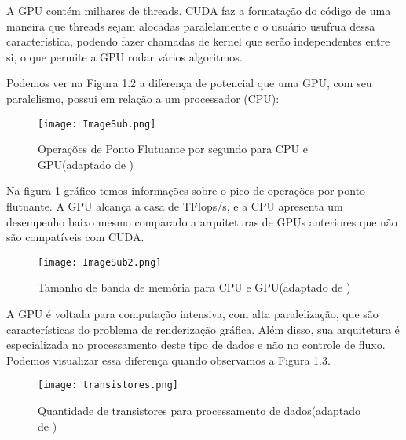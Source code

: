 A GPU contém milhares de threads. CUDA faz a formatação do código de uma maneira que threads sejam alocadas paralelamente e o usuário usufrua dessa característica, podendo fazer chamadas de kernel que serão independentes entre si, o que permite a GPU rodar vários algoritmos.

Podemos ver na Figura 1.2 a diferença de potencial que uma GPU, com seu paralelismo, possui em relação a um processador (CPU):

\begin{figure}[!htb]
	\begin{center}
	\centering
			\texttt{[image: ImageSub.png]}
	\label{fig: graficosCuda1}
	\caption{Operações de Ponto Flutuante por segundo para CPU e GPU(adaptado de \cite{cuda})}
	\end{center}
\end{figure}

Na figura \ref{fig: graficosCuda1} gráfico temos informações sobre o pico de operações por ponto flutuante. A GPU alcança a casa de TFlops/s, e a CPU apresenta um desempenho baixo mesmo comparado a arquiteturas de GPUs anteriores que não são compatíveis com CUDA.

\begin{figure}[!htb]
	\begin{center}
	\centering
			\texttt{[image: ImageSub2.png]}
	\label{fig: graficosCuda2}
	\caption{Tamanho de banda de memória para CPU e GPU(adaptado de \cite{cuda})}
	\end{center}
\end{figure}

A GPU é voltada para computação intensiva, com alta paralelização, que são características do problema de renderização gráfica. Além disso, sua arquitetura é especializada no processamento deste tipo de dados e não no controle de fluxo. Podemos visualizar essa diferença quando
observamos a Figura 1.3.

\begin{figure}[!htb]
	\begin{center}
	\centering
			\texttt{[image: transistores.png]}
	\label{fig: transistores}
	\caption{Quantidade de transistores para processamento de dados(adaptado de \cite{cuda})}
	\end{center}
\end{figure}

